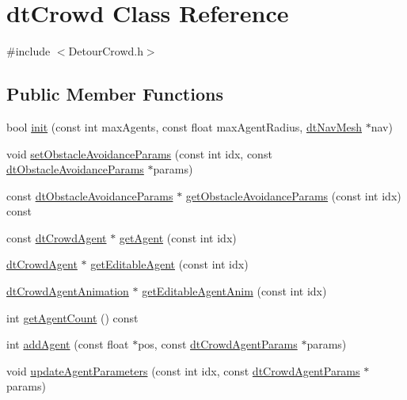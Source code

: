 \hypertarget{classdtCrowd}{}\section{dt\+Crowd Class Reference}
\label{classdtCrowd}


{\ttfamily \#include $<$Detour\+Crowd.\+h$>$}

\subsection*{Public Member Functions}
\begin{DoxyCompactItemize}
\item 
bool \hyperlink{classdtCrowd_a2f670cde9e10d07e3ed189ea861f37e4}{init} (const int max\+Agents, const float max\+Agent\+Radius, \hyperlink{classdtNavMesh}{dt\+Nav\+Mesh} $\ast$nav)
\item 
void \hyperlink{classdtCrowd_a96338b9a99e8d58a3051a9ce7934e8b1}{set\+Obstacle\+Avoidance\+Params} (const int idx, const \hyperlink{structdtObstacleAvoidanceParams}{dt\+Obstacle\+Avoidance\+Params} $\ast$params)
\item 
const \hyperlink{structdtObstacleAvoidanceParams}{dt\+Obstacle\+Avoidance\+Params} $\ast$ \hyperlink{classdtCrowd_a4da076dabe04b63d801c63c99d2fb5bb}{get\+Obstacle\+Avoidance\+Params} (const int idx) const
\item 
const \hyperlink{structdtCrowdAgent}{dt\+Crowd\+Agent} $\ast$ \hyperlink{classdtCrowd_aeef39643256ddad7ae421c78dda0ce06}{get\+Agent} (const int idx)
\item 
\hyperlink{structdtCrowdAgent}{dt\+Crowd\+Agent} $\ast$ \hyperlink{classdtCrowd_aa6b571af2a8c628063b904c7b1a5e910}{get\+Editable\+Agent} (const int idx)
\item 
\hyperlink{structdtCrowdAgentAnimation}{dt\+Crowd\+Agent\+Animation} $\ast$ \hyperlink{classdtCrowd_aa8cc112f7a11e13a4f8e4584d417eb9d}{get\+Editable\+Agent\+Anim} (const int idx)
\item 
int \hyperlink{classdtCrowd_a87dc2372038ee12d9043a65737880b78}{get\+Agent\+Count} () const
\item 
int \hyperlink{classdtCrowd_ae8c89febfd979a6b963c62d8cdb60653}{add\+Agent} (const float $\ast$pos, const \hyperlink{structdtCrowdAgentParams}{dt\+Crowd\+Agent\+Params} $\ast$params)
\item 
void \hyperlink{classdtCrowd_a6ed4aa0026c21593daa9ea12c71f84c2}{update\+Agent\+Parameters} (const int idx, const \hyperlink{structdtCrowdAgentParams}{dt\+Crowd\+Agent\+Params} $\ast$params)

\end{DoxyCompactItemize}
